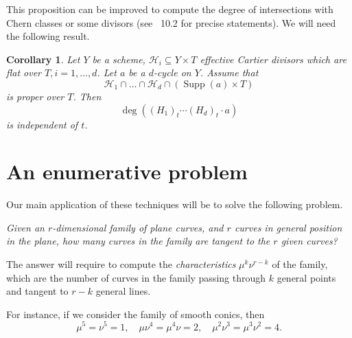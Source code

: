 \documentclass[leqno, openany]{memoir}
\newtheorem{cor}[thm]{Corollary}
\theoremstyle{definition}
\theoremstyle{remark}
\theoremstyle{plain}
\theoremstyle{definition}
\theoremstyle{remark}
\newcommand{\mc}[1]{\mathcal{#1}}
\DeclareMathOperator{\Supp}{Supp}
\begin{document}
This proposition can be improved to compute the degree of intersections with Chern classes or some divisors (see \textsection~10.2 for precise statements). We will need the following result.

\begin{cor}
Let $Y$ be a scheme, $\mc{H}_i \subseteq Y \times T$ effective Cartier divisors which are flat over $T, i=1, \dots, d$. Let $a$ be a $d$-cycle on $Y$. Assume that
\[ \mc{H}_1 \cap \dots \cap \mc{H}_d \cap (\Supp(a) \times T) \]
is proper over $T$. Then
\[ \deg({ (H_1) }_t \cdots { (H_d) }_t \cdot a) \]
is independent of $t$. 
\end{cor}

\section{An enumerative problem}

Our main application of these techniques will be to solve the following problem.
\begin{center}
\emph{Given an $r$-dimensional family of plane curves, and $r$ curves in general position in the plane, how many curves in the family are tangent to the $r$ given curves?}
\end{center}

The answer will require to compute the \emph{characteristics} $\mu^k \nu^{r-k}$ of the family, which are the number of curves in the family passing through $k$ general points and tangent to $r-k$ general lines. 

For instance, if we consider the family of smooth conics, then
\[ \mu^5 = \nu^5 = 1, \quad \mu\nu^4=\mu^4\nu=2, \quad \mu^2\nu^3=\mu^3\nu^2=4. \]
\end{document}
